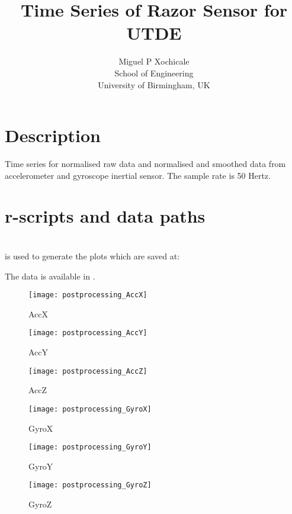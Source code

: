 \documentclass[a4paper,12pt]{article}
\title{Time Series of Razor Sensor for UTDE}
\author{Miguel P Xochicale \\
School of Engineering\\
University of Birmingham, UK}
\begin{document}
\maketitle



\section{Description}
Time series for normalised raw data and normalised and smoothed data from  accelerometer and gyroscope inertial sensor.
The sample rate is 50 Hertz. 


\section{r-scripts and data paths}
 \\
is used to generate the plots which are saved at: \\


The data is available in \cite{mxochicale2018}.









\begin{figure}
\centering
\texttt{[image: postprocessing\_AccX]}
\caption{AccX}
\end{figure}



\begin{figure}
\centering
\texttt{[image: postprocessing\_AccY]}
\caption{AccY}
\end{figure}



\begin{figure}
\centering
\texttt{[image: postprocessing\_AccZ]}
\caption{AccZ}
\end{figure}



\begin{figure}
\centering
\texttt{[image: postprocessing\_GyroX]}
\caption{GyroX}
\end{figure}



\begin{figure}
\centering
\texttt{[image: postprocessing\_GyroY]}
\caption{GyroY}
\end{figure}



\begin{figure}
\centering
\texttt{[image: postprocessing\_GyroZ]}
\caption{GyroZ}
\end{figure}
\end{document}
